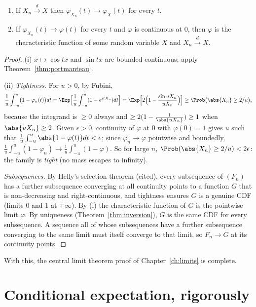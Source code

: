\begin{theorem}\label{thm:levy}
\begin{enumerate}[label=(\roman*)]
\item If $X_n\xrightarrow{d}X$ then $\varphi_{X_n}(t)\to\varphi_X(t)$ for every $t$.
\item If $\varphi_{X_n}(t)\to\varphi(t)$ for every $t$ and $\varphi$ is continuous at $0$, then
$\varphi$ is the characteristic function of some random variable $X$ and $X_n\xrightarrow{d}X$.
\end{enumerate}
\end{theorem}
\begin{proof}
(i) $x\mapsto\cos tx$ and $\sin tx$ are bounded continuous; apply
Theorem~\ref{thm:portmanteau}.

(ii) \emph{Tightness.} For $u>0$, by Fubini,
\[
\frac1u\int_{-u}^u\bigl(1-\varphi_n(t)\bigr)dt=\Exp\Bigl[\frac1u\int_{-u}^u(1-e^{itX_n})dt\Bigr]
=\Exp\Bigl[2\Bigl(1-\frac{\sin uX_n}{uX_n}\Bigr)\Bigr]\ge\Prob\bigl(\abs{X_n}\ge2/u\bigr),
\]
because the integrand is $\ge0$ always and $\ge2(1-\tfrac1{\abs{uX_n}})\ge1$ when $\abs{uX_n}\ge2$.
Given $\epsilon>0$, continuity of $\varphi$ at $0$ with $\varphi(0)=1$ gives $u$ such that
$\frac1u\int_{-u}^u\abs{1-\varphi(t)}dt<\epsilon$; since $\varphi_n\to\varphi$ pointwise and
boundedly, $\frac1u\int_{-u}^u(1-\varphi_n)\to\frac1u\int_{-u}^u(1-\varphi)$. So for large $n$,
$\Prob(\abs{X_n}\ge2/u)<2\epsilon$: the family is \emph{tight} (no mass escapes to infinity).

\emph{Subsequences.} By Helly's selection theorem (cited), every subsequence of $(F_n)$
has a further subsequence converging at all continuity points to a function $G$ that is
non-decreasing and right-continuous, and tightness ensures $G$ is a genuine CDF (limits
$0$ and $1$ at $\mp\infty$). By (i) the characteristic function of $G$ is the pointwise
limit $\varphi$. By uniqueness (Theorem~\ref{thm:inversion}), $G$ is the same CDF for every
subsequence. A sequence all of whose subsequences have a further subsequence converging to
the same limit must itself converge to that limit, so $F_n\to G$ at its continuity points.
\end{proof}

With this, the central limit theorem proof of Chapter~\ref{ch:limits} is complete.

\section{Conditional expectation, rigorously}

